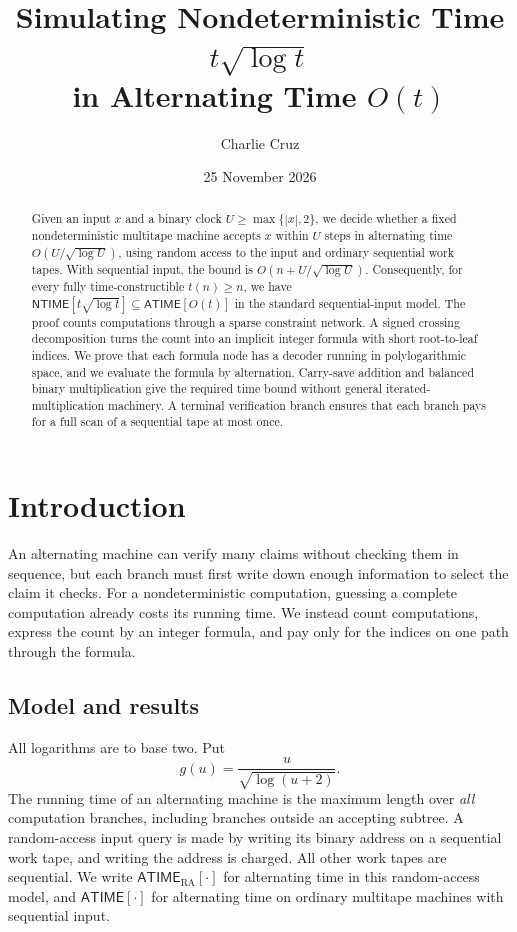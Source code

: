 \documentclass[11pt]{article}
\title{Simulating Nondeterministic Time \texorpdfstring{$t\sqrt{\log t}$}{t sqrt(log t)}\\in Alternating Time \texorpdfstring{$O(t)$}{O(t)}}
\author{Charlie Cruz}
\date{25 November 2026}
\theoremstyle{definition}
\theoremstyle{remark}
\newcommand{\NTIME}{\mathsf{NTIME}}
\newcommand{\ATIME}{\mathsf{ATIME}}
\newcommand{\ARA}{\mathsf{ATIME}_{\mathrm{RA}}}
\begin{document}
\maketitle
\vspace{-2.5em}
\begin{abstract}
Given an input $x$ and a binary clock $U\ge\max\{|x|,2\}$, we decide whether a fixed nondeterministic multitape machine accepts $x$ within $U$ steps in alternating time $O(U/\sqrt{\log U})$, using random access to the input and ordinary sequential work tapes. With sequential input, the bound is $O(n+U/\sqrt{\log U})$. Consequently, for every fully time-constructible $t(n)\ge n$, we have $\NTIME[t\sqrt{\log t}]\subseteq\ATIME[O(t)]$ in the standard sequential-input model. The proof counts computations through a sparse constraint network. A signed crossing decomposition turns the count into an implicit integer formula with short root-to-leaf indices. We prove that each formula node has a decoder running in polylogarithmic space, and we evaluate the formula by alternation. Carry-save addition and balanced binary multiplication give the required time bound without general iterated-multiplication machinery. A terminal verification branch ensures that each branch pays for a full scan of a sequential tape at most once.
\end{abstract}

\section{Introduction}\label{sec:intro}

An alternating machine can verify many claims without checking them in sequence, but each branch must first write down enough information to select the claim it checks. For a nondeterministic computation, guessing a complete computation already costs its running time. We instead count computations, express the count by an integer formula, and pay only for the indices on one path through the formula.

\subsection{Model and results}

All logarithms are to base two. Put
\[
 g(u)=\frac{u}{\sqrt{\log(u+2)}}.
\]
The running time of an alternating machine is the maximum length over \emph{all} computation branches, including branches outside an accepting subtree. A random-access input query is made by writing its binary address on a sequential work tape, and writing the address is charged. All other work tapes are sequential. We write $\ARA[\cdot]$ for alternating time in this random-access model, and $\ATIME[\cdot]$ for alternating time on ordinary multitape machines with sequential input.
\end{document}
